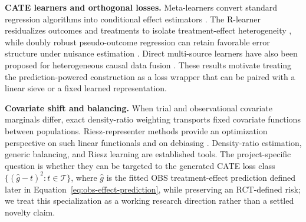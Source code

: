 \textbf{CATE learners and orthogonal losses.} Meta-learners convert standard regression algorithms into conditional effect estimators \citep{kunzel2019metalearners}. The R-learner residualizes outcomes and treatments to isolate treatment-effect heterogeneity \citep{nie2020rlearner}, while doubly robust pseudo-outcome regression can retain favorable error structure under nuisance estimation \citep{kennedy2022drlearner}. Direct multi-source learners have also been proposed for heterogeneous causal data fusion \citep{li2022directfusion}. These results motivate treating the prediction-powered construction as a loss wrapper that can be paired with a linear sieve or a fixed learned representation.

\textbf{Covariate shift and balancing.} When trial and observational covariate marginals differ, exact density-ratio weighting transports fixed covariate functions between populations. Riesz-representer methods provide an optimization perspective on such linear functionals and on debiasing \citep{chernozhukov2021riesz}. Density-ratio estimation, generic balancing, and Riesz learning are established tools. The project-specific question is whether they can be targeted to the generated CATE loss class $\{(\widehat{g}-t)^2:t\in\mathcal T\}$, where $\widehat{g}$ is the fitted OBS treatment-effect prediction defined later in Equation~\eqref{eq:obs-effect-prediction}, while preserving an RCT-defined risk; we treat this specialization as a working research direction rather than a settled novelty claim.

